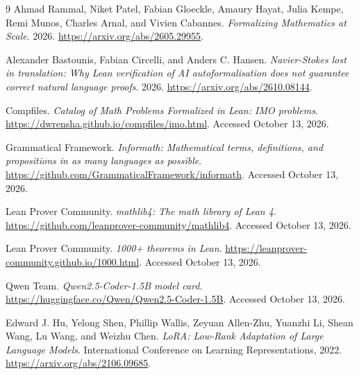 \documentclass[12pt]{article}
\begin{document}
\newpage

\begin{thebibliography}{9}
Ahmad Rammal, Niket Patel, Fabian Gloeckle, Amaury Hayat, Julia Kempe,
Remi Munos, Charles Arnal, and Vivien Cabannes.
\newblock \emph{Formalizing Mathematics at Scale}. 2026.
\newblock \url{https://arxiv.org/abs/2605.29955}.

Alexander Bastounis, Fabian Circelli, and Anders C. Hansen.
\newblock \emph{Navier-Stokes lost in translation: Why Lean verification of AI
autoformalisation does not guarantee correct natural language proofs}. 2026.
\newblock \url{https://arxiv.org/abs/2610.08144}.

Compfiles.
\newblock \emph{Catalog of Math Problems Formalized in Lean: IMO problems}.
\newblock \url{https://dwrensha.github.io/compfiles/imo.html}.
\newblock Accessed October 13, 2026.

Grammatical Framework.
\newblock \emph{Informath: Mathematical terms, definitions, and propositions
in as many languages as possible}.
\newblock \url{https://github.com/GrammaticalFramework/informath}.
\newblock Accessed October 13, 2026.

Lean Prover Community.
\newblock \emph{mathlib4: The math library of Lean 4}.
\newblock \url{https://github.com/leanprover-community/mathlib4}.
\newblock Accessed October 13, 2026.

Lean Prover Community.
\newblock \emph{1000+ theorems in Lean}.
\newblock \url{https://leanprover-community.github.io/1000.html}.
\newblock Accessed October 13, 2026.

Qwen Team.
\newblock \emph{Qwen2.5-Coder-1.5B model card}.
\newblock \url{https://huggingface.co/Qwen/Qwen2.5-Coder-1.5B}.
\newblock Accessed October 13, 2026.

Edward J. Hu, Yelong Shen, Phillip Wallis, Zeyuan Allen-Zhu,
Yuanzhi Li, Shean Wang, Lu Wang, and Weizhu Chen.
\newblock \emph{LoRA: Low-Rank Adaptation of Large Language Models}.
\newblock International Conference on Learning Representations, 2022.
\newblock \url{https://arxiv.org/abs/2106.09685}.
\end{thebibliography}
\end{document}
